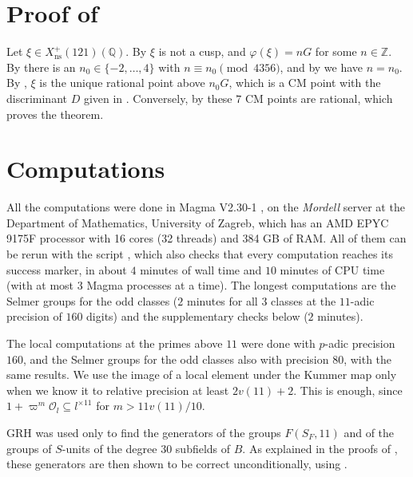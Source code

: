 \documentclass[11pt,reqno]{amsart}
\newcommand{\Q}{\mathbb{Q}}
\newcommand{\Z}{\mathbb{Z}}
\newcommand{\OO}{\mathcal{O}}
\newcommand{\ns}{\mathrm{ns}}
\newcommand{\Xns}[1]{X_{\ns}^+(#1)}
\newcommand{\repocommit}{c12c8c3705ed0b6b52254df69bd5ffe84542d568}
\newcommand{\githubbare}[1]{\href{https://github.com/F-Najman/Xns-121-/blob/\repocommit/#1}{\path{#1}}}
\theoremstyle{definition}
\numberwithin{equation}{section}
\begin{document}
\section{Proof of \texorpdfstring{}{Theorem 1.1}}\label{sec:proof}

Let $\xi\in\Xns{121}(\Q)$. By  $\xi$ is not a cusp, and $\varphi(\xi)=nG$ for some $n\in\Z$. By  there is an $n_0\in\{-2,\ldots,4\}$ with $n\equiv n_0\pmod{4356}$, and by  we have $n=n_0$. By , $\xi$ is the unique rational point above $n_0G$, which is a CM point with the discriminant $D$ given in . Conversely, by  these $7$ CM points are rational, which proves the theorem.

\section{Computations}\label{sec:computations}

All the computations were done in Magma V2.30-1 \cite{magma}, on the \textit{Mordell} server at the Department of Mathematics, University of Zagreb, which has an AMD EPYC 9175F processor with 16 cores (32 threads) and 384 GB of RAM. All of them can be rerun with the script \githubbare{run_all.sh}, which also checks that every computation reaches its success marker, in about $4$ minutes of wall time and $10$ minutes of CPU time (with at most $3$ Magma processes at a time). The longest computations are the Selmer groups for the odd classes ($2$ minutes for all $3$ classes at the $11$-adic precision of $160$ digits) and the supplementary checks below ($2$ minutes).

The local computations at the primes above $11$ were done with $p$-adic precision $160$, and the Selmer groups for the odd classes also with precision $80$, with the same results. We use the image of a local element under the Kummer map only when we know it to relative precision at least $2v(11)+2$. This is enough, since $1+\varpi^{m}\OO_l\subseteq l^{\times 11}$ for $m>11v(11)/10$.

GRH was used only to find the generators of the groups $F(S_F,11)$ and of the groups of $S$-units of the degree $30$ subfields of $B$. As explained in the proofs of , these generators are then shown to be correct unconditionally, using .
\end{document}
